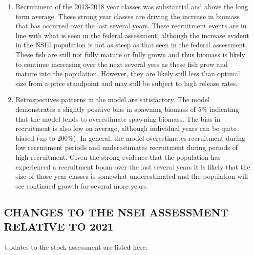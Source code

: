 \documentclass[
]{article}
\begin{document}
\begin{enumerate}
\item
  Recruitment of the 2013-2018 year classes was substantial and above the long term average. These strong year classes are driving the increase in biomass that has occurred over the last several years. These recruitment events are in line with what is seen in the federal assessment, although the increase evident in the NSEI population is not as steep as that seen in the federal assessment. These fish are still not fully mature or fully grown and thus biomass is likely to continue increasing over the next several yers as these fish grow and mature into the population. However, they are likely still less than optimal size from a price standpoint and may still be subject to high release rates.\\
\item
  Retrospectives patterns in the model are satisfactory. The model demonstrates a slightly positive bias in spawning biomass of 5\% indicating that the model tends to overestimate spawning biomass. The bias in recruitment is also low on average, although individual years can be quite biased (up to 200\%). In general, the model overestimates recruitment during low recruitment periods and underestimates recruitment during periods of high recruitment. Given the strong evidence that the population has experienced a recruitment boom over the last several years it is likely that the size of those year classes is somewhat underestimated and the population will see continued growth for several more years.
\end{enumerate}

\hypertarget{changes-to-the-nsei-assessment-relative-to-2021}{%
\subsection{CHANGES TO THE NSEI ASSESSMENT RELATIVE TO 2021}\label{changes-to-the-nsei-assessment-relative-to-2021}}

Updates to the stock assessment are listed here:
\end{document}

